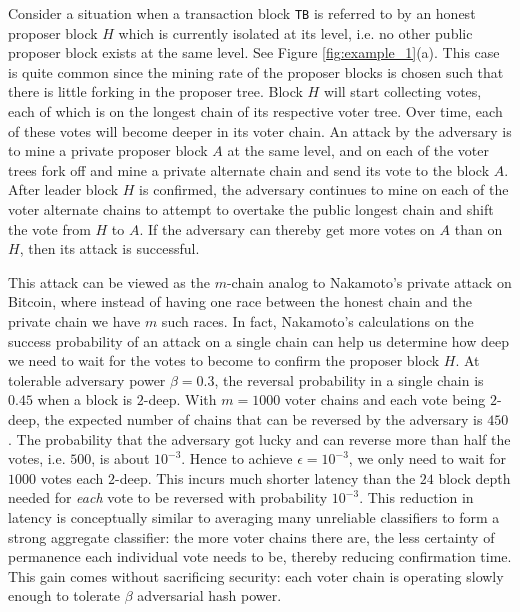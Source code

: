 \documentclass{article}
\begin{document}
Consider a situation when a transaction block \texttt{TB} is referred to by an honest proposer block $H$ which is currently isolated at its level, i.e. no other public proposer block exists at the same level. See Figure \ref{fig:example_1}(a). 
This case is quite common since the mining rate of the proposer blocks is chosen such that there is little forking in the proposer tree. Block $H$ will start collecting votes, each of which is on the longest chain of its respective voter tree. Over time, each of these votes will become deeper in its voter chain. An attack by the adversary is to mine a private proposer block $A$ at the same level, and on each of the voter trees fork off and mine a private alternate chain and send its vote to the block $A$. After leader block $H$ is confirmed, the adversary continues to mine on each of the voter alternate chains to attempt to overtake the public longest chain and shift the vote from $H$ to $A$. If the adversary can thereby get more votes on $A$ than on $H$, then its attack is successful.


This attack can be viewed as the $m$-chain analog to Nakamoto's private attack on {\sf Bitcoin}, where instead of having one race between the honest chain and the private chain we have $m$ such races.  In fact, Nakamoto's calculations on the success probability of an attack on a single chain can help us determine how deep we need to wait for the votes to become to confirm the proposer block $H$. At tolerable adversary power $\beta = 0.3$, the reversal probability in a single chain is $0.45$ when a block is $2$-deep. With $m=1000$ voter chains and each vote being $2$-deep, the expected number of chains that can be reversed by the adversary is $450$. The probability that the adversary got lucky and can reverse more than half the votes, i.e. $500$, is about $10^{-3}$. Hence to achieve $\epsilon = 10^{-3}$, we only need to wait for $1000$ votes each $2$-deep. This incurs much shorter latency than the $24$ block depth needed for {\em each} vote to be reversed with probability $10^{-3}$. This reduction in latency is conceptually similar to averaging many unreliable  classifiers to form a strong aggregate classifier:  the more voter chains there are, the less certainty of permanence each individual vote needs to be, thereby reducing confirmation time. This gain comes without sacrificing security: each voter chain is operating slowly enough to tolerate $\beta$ adversarial hash power. 
\end{document}
